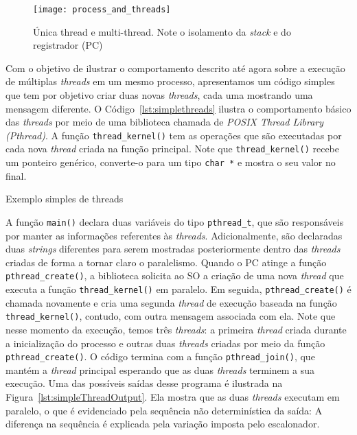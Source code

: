 \begin{figure}[!h]
  \centering
  \texttt{[image: process\_and\_threads]}
  \caption{Única thread e multi-thread. Note o isolamento da \emph{stack} e do registrador (PC) \citep{silberschatz}}
  \label{fig:single_thread_multi_thread}
\end{figure}

Com o objetivo de ilustrar o comportamento descrito até agora sobre a execução
de múltiplas \emph{threads} em um mesmo processo, apresentamos um código
simples que tem por objetivo criar duas novas \emph{threads}, cada uma mostrando
uma mensagem diferente. O Código~\ref{lst:simplethreads} ilustra o
comportamento básico das \emph{threads} por meio de uma biblioteca chamada de
\emph{POSIX Thread Library (Pthread)}. A função
\texttt{thread\_kernel()} tem as operações que são executadas por cada nova
\emph{thread} criada na função principal. Note que \texttt{thread\_kernel()}
recebe um ponteiro genérico, converte-o para um tipo \texttt{char *} e
mostra o seu valor no final.

\begin{ruledcaption}{Exemplo simples de threads\label{lst:simplethreads}}

\end{ruledcaption}

A função \texttt{main()} declara duas variáveis do tipo \texttt{pthread\_t},
que são responsáveis por manter as informações referentes às \emph{threads}.
Adicionalmente, são declaradas duas \emph{strings} diferentes para serem
mostradas posteriormente dentro das \emph{threads} criadas de forma a
tornar claro o paralelismo. Quando o PC atinge a função
\texttt{pthread\_create()}, a biblioteca solicita ao SO a criação de uma nova
\emph{thread} que executa a função \texttt{thread\_kernel()} em paralelo. Em
seguida, \texttt{pthread\_create()} é chamada novamente e cria uma segunda
\emph{thread} de execução baseada na função \texttt{thread\_kernel()}, contudo,
com outra mensagem associada com ela. Note que nesse momento da execução, temos
três \emph{threads}: a primeira \emph{thread} criada durante a inicialização do
processo e outras duas \emph{threads} criadas por meio da função
\texttt{pthread\_create()}. O código termina com a função
\texttt{pthread\_join()}, que mantém a \emph{thread} principal esperando que as
duas \emph{threads} terminem a sua execução. Uma das possíveis saídas desse
programa é ilustrada na Figura~\ref{lst:simpleThreadOutput}. Ela mostra que as
duas \emph{threads} executam em paralelo, o que é evidenciado pela sequência não
determinística da saída: A diferença na sequência é explicada pela variação
imposta pelo escalonador.


